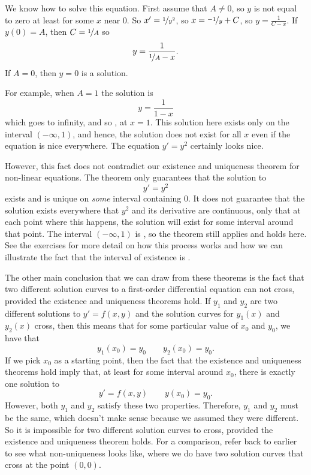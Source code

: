 \begin{exampleSol}
We know how to solve this equation.  First assume that $A \not= 0$,
so $y$ is not equal to zero at least for some $x$ near 0.  So
$x' = \nicefrac{1}{y^2}$, so
$x = \nicefrac{-1}{y} + C$, so $y = \frac{1}{C-x}$.  If $y(0) = A$, then
$C = \nicefrac{1}{A}$ so
\begin{equation*}
y = \frac{1}{\nicefrac{1}{A} - x} .
\end{equation*}
If $A=0$, then $y=0$ is a solution.

For example, when $A=1$
the solution is \begin{equation*}
y = \frac{1}{1-x}
\end{equation*}
which goes to infinity, and so , at $x=1$. This solution here exists only on the interval $(-\infty, 1)$, and hence, the solution does not exist
for all $x$ even if the equation is nice everywhere.  The equation
$y' = y^2$ certainly
looks nice. 

However, this fact does not contradict our existence and uniqueness theorem for non-linear equations. The theorem only guarantees that the solution to \begin{equation*}
y' = y^2
\end{equation*}
exists and is unique on \emph{some} interval containing 0. It does not guarantee that the solution exists everywhere that $y^2$ and its derivative are continuous, only that at each point where this happens, the solution will exist for some interval around that point. The interval $(-\infty, 1)$ is , so the theorem still applies and holds here. See the exercises for more detail on how this process works and how we can illustrate the fact that the interval of existence is . 
\end{exampleSol}

The other main conclusion that we can draw from these theorems is the fact that two different solution curves to a first-order differential equation can not cross, provided the existence and uniqueness theorems hold. If $y_1$ and $y_2$ are two different solutions to $y' = f(x,y)$ and the solution curves for $y_1(x)$ and $y_2(x)$ cross, then this means that for some particular value of $x_0$ and $y_0$, we have that
\begin{equation*}
y_1(x_0) = y_0 \qquad y_2(x_0) = y_0.
\end{equation*}
If we pick $x_0$ as a starting point, then the fact that the existence and uniqueness theorems hold imply that, at least for some interval around $x_0$, there is exactly one solution to 
\begin{equation*}
y' = f(x,y) \qquad y(x_0) = y_0.
\end{equation*} 
However, both $y_1$ and $y_2$ satisfy these two properties. Therefore, $y_1$ and $y_2$ must be the same, which doesn't make sense because we assumed they were different. So it is impossible for two different solution curves to cross, provided the existence and uniqueness theorem holds. For a comparison, refer back to  earlier to see what non-uniqueness looks like, where we do have two solution curves that cross at the point $(0,0)$.


